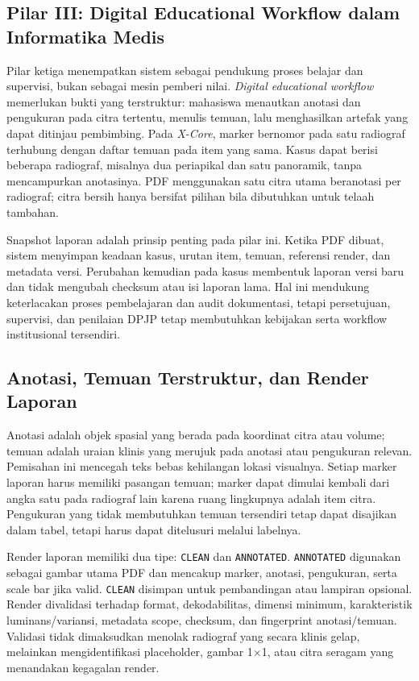 \documentclass[12pt,a4paper,oneside]{report}
\newcommand{\xcore}{\textit{X-Core}}
\begin{document}
\subsection{Pilar III: Digital Educational Workflow dalam Informatika Medis}

Pilar ketiga menempatkan sistem sebagai pendukung proses belajar dan supervisi, bukan sebagai mesin pemberi nilai. \textit{Digital educational workflow} memerlukan bukti yang terstruktur: mahasiswa menautkan anotasi dan pengukuran pada citra tertentu, menulis temuan, lalu menghasilkan artefak yang dapat ditinjau pembimbing. Pada \xcore{}, marker bernomor pada satu radiograf terhubung dengan daftar temuan pada item yang sama. Kasus dapat berisi beberapa radiograf, misalnya dua periapikal dan satu panoramik, tanpa mencampurkan anotasinya. PDF menggunakan satu citra utama beranotasi per radiograf; citra bersih hanya bersifat pilihan bila dibutuhkan untuk telaah tambahan.

Snapshot laporan adalah prinsip penting pada pilar ini. Ketika PDF dibuat, sistem menyimpan keadaan kasus, urutan item, temuan, referensi render, dan metadata versi. Perubahan kemudian pada kasus membentuk laporan versi baru dan tidak mengubah checksum atau isi laporan lama. Hal ini mendukung keterlacakan proses pembelajaran dan audit dokumentasi, tetapi persetujuan, supervisi, dan penilaian DPJP tetap membutuhkan kebijakan serta workflow institusional tersendiri.

\subsection{Anotasi, Temuan Terstruktur, dan Render Laporan}

Anotasi adalah objek spasial yang berada pada koordinat citra atau volume; temuan adalah uraian klinis yang merujuk pada anotasi atau pengukuran relevan. Pemisahan ini mencegah teks bebas kehilangan lokasi visualnya. Setiap marker laporan harus memiliki pasangan temuan; marker dapat dimulai kembali dari angka satu pada radiograf lain karena ruang lingkupnya adalah item citra. Pengukuran yang tidak membutuhkan temuan tersendiri tetap dapat disajikan dalam tabel, tetapi harus dapat ditelusuri melalui labelnya.

Render laporan memiliki dua tipe: \texttt{CLEAN} dan \texttt{ANNOTATED}. \texttt{ANNOTATED} digunakan sebagai gambar utama PDF dan mencakup marker, anotasi, pengukuran, serta scale bar jika valid. \texttt{CLEAN} disimpan untuk pembandingan atau lampiran opsional. Render divalidasi terhadap format, dekodabilitas, dimensi minimum, karakteristik luminans/variansi, metadata scope, checksum, dan fingerprint anotasi/temuan. Validasi tidak dimaksudkan menolak radiograf yang secara klinis gelap, melainkan mengidentifikasi placeholder, gambar 1$\times$1, atau citra seragam yang menandakan kegagalan render.
\end{document}
